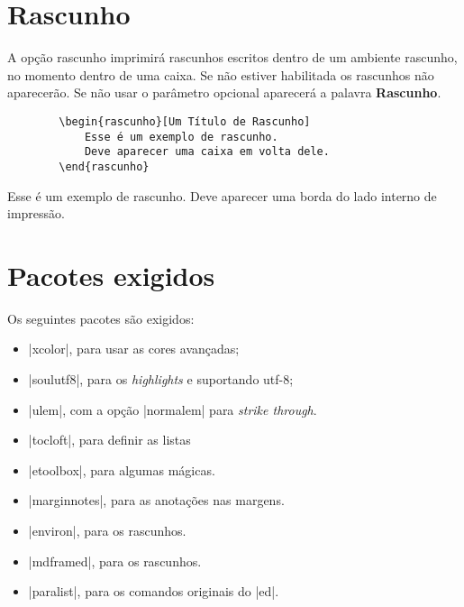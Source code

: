 \documentclass{article}
\begin{document}
    
    
    
    
    
    \section{Rascunho}
    
    A opção rascunho imprimirá rascunhos escritos dentro de um ambiente rascunho, no momento dentro de uma caixa. Se não estiver habilitada os rascunhos não aparecerão. Se não usar o parâmetro opcional aparecerá a palavra \textbf{Rascunho}.
    
    \begin{verbatim}
        \begin{rascunho}[Um Título de Rascunho]
            Esse é um exemplo de rascunho.
            Deve aparecer uma caixa em volta dele.
        \end{rascunho}
    \end{verbatim}
    
    \begin{rascunho}
        Esse é um exemplo de rascunho.
        Deve aparecer uma borda do lado interno de impressão.
    \end{rascunho}
    
    \section{Pacotes exigidos}
    
    Os seguintes pacotes são exigidos:
    \begin{itemize}
        \item |xcolor|, para usar as cores avançadas;
        \item |soulutf8|, para os \textit{highlights} e suportando utf-8;
        \item |ulem|, com a opção |normalem| para \textit{strike through}.
        \item |tocloft|, para definir as listas
        \item |etoolbox|, para algumas mágicas.
        \item |marginnotes|, para as anotações nas margens.
        \item |environ|, para os rascunhos.
        \item |mdframed|, para os rascunhos.
        \item |paralist|, para os comandos originais do |ed|.
    \end{itemize}
    
\end{document}
